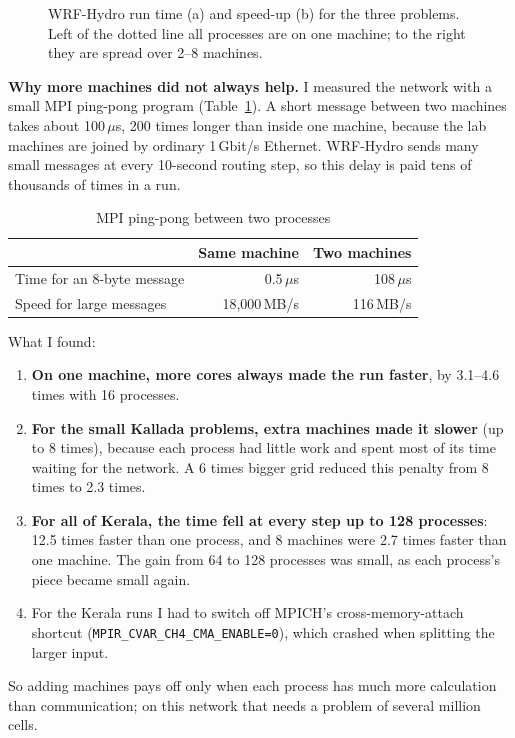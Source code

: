 \begin{figure}[H]
\centering
{}
\caption{WRF-Hydro run time (a) and speed-up (b) for the three problems. Left of the dotted line all
processes are on one machine; to the right they are spread over 2--8 machines.}
\label{fig:wrfh_scaling}
\end{figure}

\textbf{Why more machines did not always help.} I measured the network with a small MPI ping-pong
program (Table~\ref{tab:pingpong}). A short message between two machines takes about 100\,$\mu$s,
200 times longer than inside one machine, because the lab machines are joined by ordinary
1\,Gbit/s Ethernet. WRF-Hydro sends many small messages at every 10-second routing step, so this
delay is paid tens of thousands of times in a run.

\begin{table}[H]
\centering
\caption{MPI ping-pong between two processes}
\label{tab:pingpong}
\small
\begin{tabular}{lrr}
\toprule
 & \textbf{Same machine} & \textbf{Two machines} \\
\midrule
Time for an 8-byte message & 0.5\,$\mu$s & 108\,$\mu$s \\
Speed for large messages & 18{,}000\,MB/s & 116\,MB/s \\
\bottomrule
\end{tabular}
\end{table}

What I found:
\begin{enumerate}
    \item \textbf{On one machine, more cores always made the run faster}, by 3.1--4.6 times with 16
    processes.
    \item \textbf{For the small Kallada problems, extra machines made it slower} (up to 8 times),
    because each process had little work and spent most of its time waiting for the network. A
    6 times bigger grid reduced this penalty from 8 times to 2.3 times.
    \item \textbf{For all of Kerala, the time fell at every step up to 128 processes}: 12.5 times
    faster than one process, and 8 machines were 2.7 times faster than one machine. The gain from 64
    to 128 processes was small, as each process's piece became small again.
    \item For the Kerala runs I had to switch off MPICH's cross-memory-attach shortcut
    (\texttt{MPIR\_CVAR\_\allowbreak CH4\_\allowbreak CMA\_\allowbreak ENABLE=0}), which crashed when splitting the larger input.
\end{enumerate}

So adding machines pays off only when each process has much more calculation than communication; on
this network that needs a problem of several million cells.

